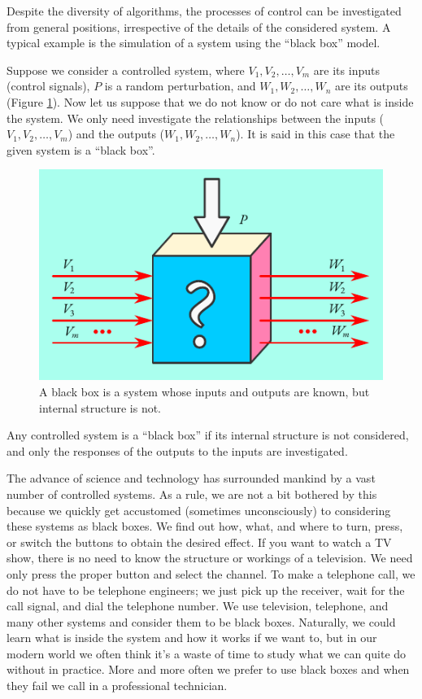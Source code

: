 Despite the diversity of algorithms, the processes of control can be
investigated from general positions, irrespective of the details of the
considered system. A typical example is the simulation of a system using
the ``black box'' model.


 Suppose we consider a controlled system,
where $V_{1}, V_{2}, \ldots , V_{m}$ are its inputs (control signals), $P$ is a random perturbation, and $W_{1}, W_{2}, \ldots , W_{n}$ are its outputs (Figure \ref{black-box-1}). Now let us suppose that we do not know or do not care what is inside the system. We only need investigate the relationships between the inputs ( $V_{1}, V_{2}, \ldots , V_{m}$) and the outputs ($W_{1}, W_{2}, \ldots , W_{n}$). It is said in this case that the given system is a ``black box''.

\begin{figure}[!ht]
 \centering
 \includegraphics[width=0.8\tfwidth]{figures/black-box-1.pdf}
\caption{A black box is a system whose inputs and outputs are known, but internal structure is not.\label{black-box-1}}
 \end{figure}
 
Any controlled system is a ``black box'' if its internal structure is not
considered, and only the responses of the outputs to the inputs are
investigated.



 The advance of science and
technology has surrounded mankind by a vast number of controlled
systems. As a rule, we are not a bit bothered by this because we quickly
get accustomed (sometimes unconsciously) to considering these systems
as black boxes. We find out how, what, and where to turn, press, or
switch the buttons to obtain the desired effect. If you want to watch
a TV show, there is no need to know the structure or workings of
a television. We need only press the proper button and select the
channel. To make a telephone call, we do not have to be telephone
engineers; we just pick up the receiver, wait for the call signal, and dial
the telephone number. We use television, telephone, and many other
systems and consider them to be black boxes. Naturally, we could learn
what is inside the system and how it works if we want to, but in our
modern world we often think it's a waste of time to study what we can
quite do without in practice. More and more often we prefer to use
black boxes and when they fail we call in a professional technician.

